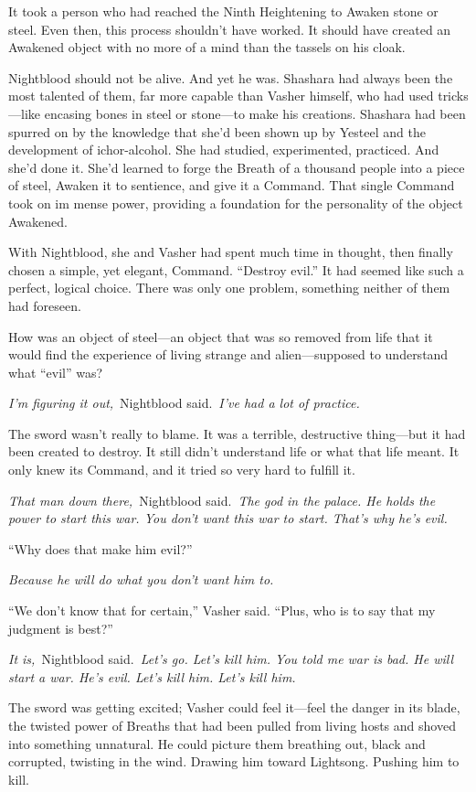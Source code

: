 It took a person who had reached the Ninth Heightening to Awaken stone or steel. Even then, this process shouldn’t have worked. It should have created an Awakened object with no more of a mind than the tassels on his cloak.

Nightblood should not be alive. And yet he was. Shashara had always been the most talented of them, far more capable than Vasher himself, who had used tricks—like encasing bones in steel or stone—to make his creations. Shashara had been spurred on by the knowledge that she’d been shown up by Yesteel and the development of ichor-alcohol. She had studied, experimented, practiced. And she’d done it. She’d learned to forge the Breath of a thousand people into a piece of steel, Awaken it to sentience, and give it a Command. That single Command took on im mense power, providing a foundation for the personality of the object Awakened.

With Nightblood, she and Vasher had spent much time in thought, then finally chosen a simple, yet elegant, Command. “Destroy evil.” It had seemed like such a perfect, logical choice. There was only one problem, something neither of them had foreseen.

How was an object of steel—an object that was so removed from life that it would find the experience of living strange and alien—supposed to understand what “evil” was?

\textit{I’m figuring it out,}~Nightblood said.~\textit{I’ve had a lot of practice.}

The sword wasn’t really to blame. It was a terrible, destructive thing—but it had been created to destroy. It still didn’t understand life or what that life meant. It only knew its Command, and it tried so very hard to fulfill it.

\textit{That man down there,}~Nightblood said.~\textit{The god in the palace. He holds the power to start this war. You don’t want this war to start. That’s why he’s evil.}

“Why does that make him evil?”

\textit{Because he will do what you don’t want him to.}

“We don’t know that for certain,” Vasher said. “Plus, who is to say that my judgment is best?”

\textit{It is,}~Nightblood said.~\textit{Let’s go. Let’s kill him. You told me war is bad. He will start a war. He’s evil. Let’s kill him. Let’s kill him.}

The sword was getting excited; Vasher could feel it—feel the danger in its blade, the twisted power of Breaths that had been pulled from living hosts and shoved into something unnatural. He could picture them breathing out, black and corrupted, twisting in the wind. Drawing him toward Lightsong. Pushing him to kill.


